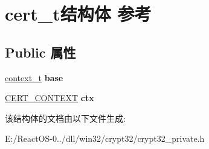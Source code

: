 \hypertarget{structcert__t}{}\section{cert\+\_\+t结构体 参考}
\label{structcert__t}
\subsection*{Public 属性}
\begin{DoxyCompactItemize}
\item 
\mbox{\label{structcert__t_a5553247fed4d1f9d48cc96e5a4891cab}} 
\hyperlink{struct__context__t}{context\+\_\+t} {\bfseries base}
\item 
\mbox{\label{structcert__t_a10aba2a319d837ef820e7179f8e10f43}} 
\hyperlink{struct___c_e_r_t___c_o_n_t_e_x_t}{C\+E\+R\+T\+\_\+\+C\+O\+N\+T\+E\+XT} {\bfseries ctx}
\end{DoxyCompactItemize}


该结构体的文档由以下文件生成\+:\begin{DoxyCompactItemize}
\item 
E\+:/\+React\+O\+S-\/0../dll/win32/crypt32/crypt32\+\_\+private.\+h\end{DoxyCompactItemize}
